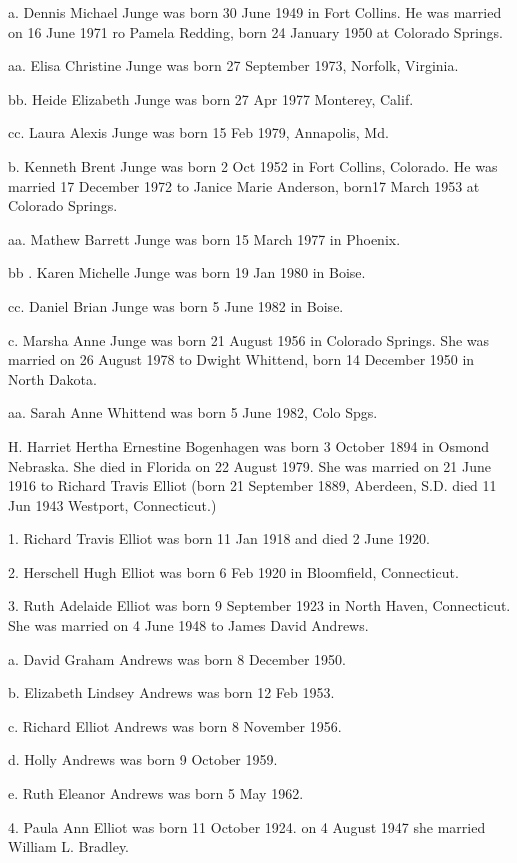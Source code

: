\documentclass[a4paper]{article}
\begin{document}
a. Dennis Michael Junge was born 30 June 1949 in Fort Collins.  He was married on 16 June 1971 ro Pamela Redding, born 24 January 1950 at Colorado Springs.

aa. Elisa Christine Junge was born 27 September 1973, Norfolk, Virginia.
 
bb. Heide Elizabeth Junge was born 27 Apr 1977 Monterey, Calif.

cc. Laura Alexis Junge was born 15 Feb 1979, Annapolis, Md.

b. Kenneth Brent Junge was born 2 Oct 1952 in Fort Collins, Colorado. He was married 17 December 1972 to Janice Marie Anderson, born17 March 1953 at Colorado Springs.

aa. Mathew Barrett Junge was born 15 March 1977 in Phoenix.

bb . Karen Michelle Junge was born 19 Jan 1980  in Boise.
				
cc. Daniel Brian Junge was born 5 June 1982 in Boise.

c. Marsha Anne Junge was born 21 August 1956 in Colorado Springs. She was married on 26 August 1978 to Dwight Whittend, born 14 December 1950 in North Dakota.

aa.  Sarah Anne Whittend was born 5 June 1982, Colo Spgs.

H. Harriet Hertha Ernestine Bogenhagen was born 3 October 1894 in Osmond Nebraska. She died in Florida on 22 August 1979.  She was married on 21 June 1916 to Richard Travis Elliot (born 21 September 1889, Aberdeen, S.D. died 11 Jun 1943 Westport, Connecticut.)

1. Richard Travis Elliot was born 11 Jan 1918 and died 2 June 1920.

2. Herschell Hugh Elliot was born 6 Feb 1920 in Bloomfield, Connecticut.

3. Ruth Adelaide Elliot was born 9 September 1923 in North Haven, Connecticut. She was married on 4 June 1948 to James David Andrews.
 
a. David Graham Andrews was born 8 December 1950.

b. Elizabeth Lindsey Andrews was born 12 Feb 1953.

c. Richard Elliot Andrews was born 8 November 1956.

d. Holly Andrews was born 9 October 1959.

e. Ruth Eleanor Andrews was born 5 May 1962.

4. Paula Ann Elliot was born 11 October 1924.  on 4 August 1947 she married William L. Bradley.
\end{document}

